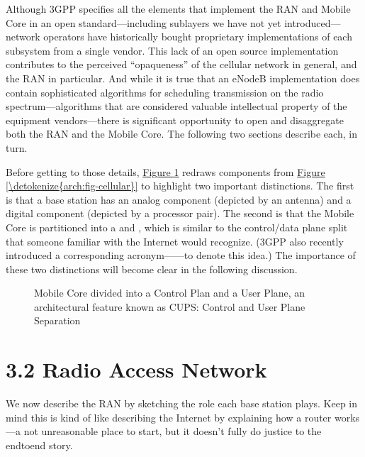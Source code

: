 \documentclass[a4paper,11pt,english]{sphinxmanual}
\let\sphinxpxdimen\pdfpxdimen\else\newdimen\sphinxpxdimen
\begin{document}
\sphinxAtStartPar
Although 3GPP specifies all the elements that implement the RAN and
Mobile Core in an open standard—including sub\sphinxhyphen{}layers we have not yet
introduced—network operators have historically bought proprietary
implementations of each subsystem from a single vendor. This lack of an
open source implementation contributes to the perceived “opaqueness” of
the cellular network in general, and the RAN in particular. And while it
is true that an eNodeB implementation does contain sophisticated
algorithms for scheduling transmission on the radio spectrum—algorithms
that are considered valuable intellectual property of the equipment
vendors—there is significant opportunity to open and disaggregate both
the RAN and the Mobile Core. The following two sections describe each,
in turn.

\sphinxAtStartPar
Before getting to those details, \hyperref[\detokenize{arch:fig-cups}]{Figure \ref{\detokenize{arch:fig-cups}}}
redraws components from \hyperref[\detokenize{arch:fig-cellular}]{Figure \ref{\detokenize{arch:fig-cellular}}} to
highlight two important distinctions. The first is that a base station has an analog
component (depicted by an antenna) and a digital component (depicted
by a processor pair). The second is that the Mobile Core is
partitioned into a  and , which is similar
to the control/data plane split that someone familiar with the
Internet would recognize. (3GPP also recently introduced a
corresponding acronym——to
denote this idea.) The importance of these two distinctions will
become clear in the following discussion.

\begin{figure}[ht]
\centering
\capstart

\noindent\sphinxincludegraphics[width=400\sphinxpxdimen]{{Slide02}.png}
\caption{Mobile Core divided into a Control Plan and a User
Plane, an architectural feature known as CUPS: Control and User
Plane Separation}\label{\detokenize{arch:id3}}\label{\detokenize{arch:fig-cups}}\end{figure}


\section{3.2 Radio Access Network}
\label{\detokenize{arch:radio-access-network}}
\sphinxAtStartPar
We now describe the RAN by sketching the role each base station plays.
Keep in mind this is kind of like describing the Internet by explaining
how a router works—a not unreasonable place to start, but it doesn’t
fully do justice to the end\sphinxhyphen{}to\sphinxhyphen{}end story.
\end{document}

